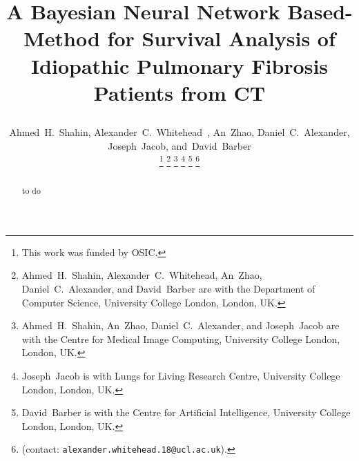 \documentclass{IEEEtran}
\begin{document}
    \title{
        
        A Bayesian Neural Network Based-Method for Survival Analysis of Idiopathic Pulmonary Fibrosis Patients from CT
    }
    
    \author{

        Ahmed~H.~Shahin,
        Alexander~C.~Whitehead~,
        An~Zhao,
        Daniel~C.~Alexander,
        Joseph~Jacob,
        and~David~Barber
    

        \thanks{This work was funded by \gls{OSIC}.}
        \thanks{Ahmed~H.~Shahin, Alexander~C.~Whitehead, An~Zhao, Daniel~C.~Alexander, and David~Barber are with the Department of Computer Science, University College London, London, UK.}
        \thanks{Ahmed~H.~Shahin, An~Zhao, Daniel~C.~Alexander, and Joseph~Jacob are with the Centre for Medical Image Computing, University College London, London, UK.}
        \thanks{Joseph~Jacob is with Lungs for Living Research Centre, University College London, London, UK.}
        \thanks{David~Barber is with the Centre for Artificial Intelligence, University College London, London, UK.}
        \thanks{(contact: \texttt{alexander.whitehead.18@ucl.ac.uk}).}
    }
    
    \pagestyle{plain}
    
    \maketitle
    
    \begin{abstract}
        to do
    \end{abstract}
    
        
    
    
    
    
    
    
    
    \AtNextBibliography{
        }
    \printbibliography
\end{document}
